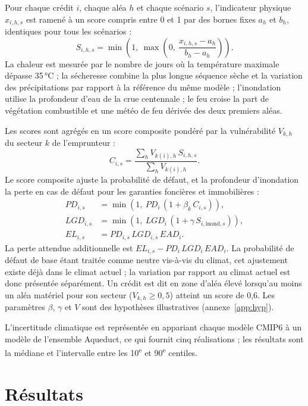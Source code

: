 \documentclass[11pt,a4paper]{article}
\begin{document}
Pour chaque crédit $i$, chaque aléa $h$ et chaque scénario $s$, l'indicateur physique $x_{i,h,s}$ est ramené à un score compris entre 0 et 1 par des bornes fixes $a_h$ et $b_h$, identiques pour tous les scénarios :
\begin{equation}
S_{i,h,s} = \min\!\left(1,\ \max\!\left(0,\ \frac{x_{i,h,s} - a_h}{b_h - a_h}\right)\right).
\end{equation}
La chaleur est mesurée par le nombre de jours où la température maximale dépasse 35\,°C ; la sécheresse combine la plus longue séquence sèche et la variation des précipitations par rapport à la référence du même modèle ; l'inondation utilise la profondeur d'eau de la crue centennale ; le feu croise la part de végétation combustible et une météo de feu dérivée des deux premiers aléas.

Les scores sont agrégés en un score composite pondéré par la vulnérabilité $V_{k,h}$ du secteur $k$ de l'emprunteur :
\begin{equation}
C_{i,s} = \frac{\sum_h V_{k(i),h}\, S_{i,h,s}}{\sum_h V_{k(i),h}}.
\end{equation}
Le score composite ajuste la probabilité de défaut, et la profondeur d'inondation la perte en cas de défaut pour les garanties foncières et immobilières :
\begin{align}
PD_{i,s} &= \min\!\left(1,\ PD_i\,(1 + \beta_k\, C_{i,s})\right), \\
LGD_{i,s} &= \min\!\left(1,\ LGD_i\,(1 + \gamma\, S_{i,\text{inond},s})\right), \\
EL_{i,s} &= PD_{i,s}\, LGD_{i,s}\, EAD_i .
\end{align}
La perte attendue additionnelle est $EL_{i,s} - PD_i\,LGD_i\,EAD_i$. La probabilité de défaut de base étant traitée comme neutre vis-à-vis du climat, cet ajustement existe déjà dans le climat actuel ; la variation par rapport au climat actuel est donc présentée séparément. Un crédit est dit en zone d'aléa élevé lorsqu'au moins un aléa matériel pour son secteur ($V_{k,h} \geq 0{,}5$) atteint un score de 0,6. Les paramètres $\beta$, $\gamma$ et $V$ sont des hypothèses illustratives (annexe~\ref{app:hyp}).

L'incertitude climatique est représentée en appariant chaque modèle CMIP6 à un modèle de l'ensemble Aqueduct, ce qui fournit cinq réalisations ; les résultats sont la médiane et l'intervalle entre les 10\textsuperscript{e} et 90\textsuperscript{e} centiles.

\section{Résultats}\label{sec:resultats}
\end{document}
